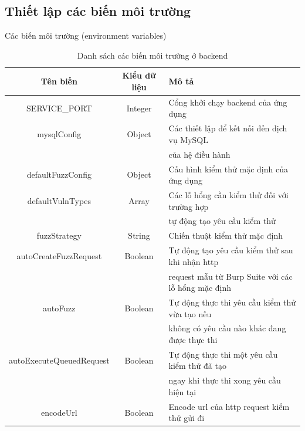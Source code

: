 \subsection{Thiết lập các biến môi trường}
Các biến môi trường (environment variables) 
\FloatBarrier
\begin{table}[ht]
    \centering
    \caption{Danh sách các biến môi trường ở backend}
    \label{tab:env-variables-backend}
    \begin{tabular}[ht]{ccl}
        \toprule[1pt]\midrule[0.3pt]
            \textbf{Tên biến}&\textbf{Kiểu dữ liệu}&\textbf{Mô tả}\\ 
        \midrule
            SERVICE\_PORT&Integer&Cổng khởi chạy backend của ứng dụng\\
            \addlinespace
            mysqlConfig&Object&Các thiết lập để kết nối đến dịch vụ MySQL\\
            {}&{}&của hệ điều hành\\
            \addlinespace
            defaultFuzzConfig&Object&Cấu hình kiểm thử mặc định của ứng dụng\\
            \addlinespace
            defaultVulnTypes&Array&Các lỗ hổng cần kiểm thử đối với trường hợp\\
            {}&{}&tự động tạo yêu cầu kiểm thử\\
            \addlinespace
            fuzzStrategy&String&Chiến thuật kiểm thử mặc định\\
            \addlinespace
            autoCreateFuzzRequest&Boolean&Tự động tạo yêu cầu kiểm thử sau khi nhận \acrshort{http}\\
            {}&{}&request mẫu từ Burp Suite với các lỗ hổng mặc định\\
            \addlinespace
            autoFuzz&Boolean&Tự động thực thi yêu cầu kiểm thử vừa tạo nếu\\
            {}&{}&không có yêu cầu nào khác đang được thực thi\\
            \addlinespace
            autoExecuteQueuedRequest&Boolean&Tự động thực thi một yêu cầu kiểm thử đã tạo\\
            {}&{}&ngay khi thực thi xong yêu cầu hiện tại\\
            \addlinespace
            encodeUrl&Boolean&Encode \acrshort{url} của \acrshort{http} request kiểm thử gửi đi\\
        \midrule[0.3pt]\bottomrule[1pt]
    \end{tabular}
\end{table}
